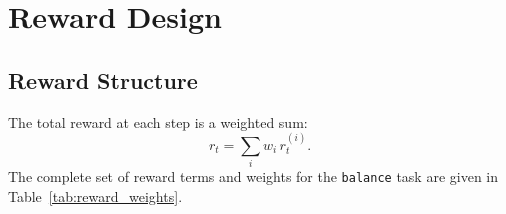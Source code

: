 \documentclass[conference]{IEEEtran}
\begin{document}
\section{Reward Design}
\label{sec:reward}

\subsection{Reward Structure}
The total reward at each step is a weighted sum:
\begin{equation}
r_t = \sum_i w_i\, r_t^{(i)}.
\label{eq:reward_total}
\end{equation}
The complete set of reward terms and weights for the \texttt{balance}
task are given in Table~\ref{tab:reward_weights}.
\end{document}
